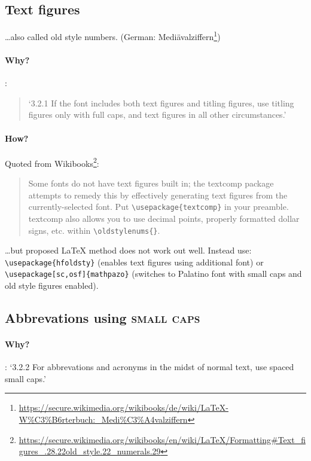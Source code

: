 \subsection{Text figures}

\ldots also called old style numbers. 
(German: Mediävalziffern\footnote{\url{https://secure.wikimedia.org/wikibooks/de/wiki/LaTeX-W\%C3\%B6rterbuch:\_Medi\%C3\%A4valziffern}})
\paragraph{Why?} \cite[p 44f]{Bringhurst1993}: 
\begin{quote}
`3.2.1 If the font includes both text figures and titling figures, use
 titling figures only with full caps, and text figures in all other
 circumstances.'
\end{quote}

\paragraph{How?} 
Quoted from Wikibooks\footnote{\url{https://secure.wikimedia.org/wikibooks/en/wiki/LaTeX/Formatting\#Text\_figures\_.28.22old\_style.22\_numerals.29}}:
\begin{quote}
Some fonts do not have text figures built in; the textcomp package attempts to
remedy this by effectively generating text figures from the currently-selected
font. Put \verb#\usepackage{textcomp}# in your preamble. textcomp also allows you to
use decimal points, properly formatted dollar signs, etc. within
\verb#\oldstylenums{}#.
\end{quote}
\ldots but proposed \LaTeX{} method does not work out well. Instead use:\\
\verb#\usepackage{hfoldsty}#  (enables text figures using additional font) or \\
\verb#\usepackage[sc,osf]{mathpazo}# (switches to Palatino font with small caps and old style figures enabled).

\subsection{Abbrevations using \textsc{small caps}}

\paragraph{Why?} \cite[p 45f]{Bringhurst1993}: `3.2.2 For abbrevations and
acronyms in the midst of normal text, use spaced small caps.'

